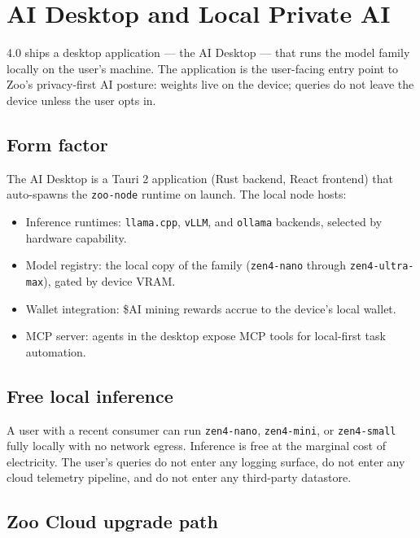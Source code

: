 \section{\Zoo{} AI Desktop and Local Private AI}
\label{sec:ai-desktop}

\Zoo{} 4.0 ships a desktop application --- the \Zoo{} AI Desktop --- that
runs the \Zen{} model family locally on the user's machine. The
application is the user-facing entry point to Zoo's privacy-first AI
posture: weights live on the device; queries do not leave the device
unless the user opts in.

\subsection{Form factor}

The \Zoo{} AI Desktop is a Tauri 2 application (Rust backend, React
frontend) that auto-spawns the \texttt{zoo-node} runtime on launch. The
local node hosts:

\begin{itemize}[leftmargin=1.2em]
  \item Inference runtimes: \texttt{llama.cpp}, \texttt{vLLM}, and
        \texttt{ollama} backends, selected by hardware capability.
  \item Model registry: the local copy of the \Zen{} family
        (\texttt{zen4-nano} through \texttt{zen4-ultra-max}), gated by
        device VRAM.
  \item Wallet integration: \$AI mining rewards accrue to the
        device's local wallet.
  \item MCP server: agents in the desktop expose \Hanzo{} MCP tools for
        local-first task automation.
\end{itemize}

\subsection{Free local inference}

A user with a recent consumer \GPU{} can run \texttt{zen4-nano},
\texttt{zen4-mini}, or \texttt{zen4-small} fully locally with no
network egress. Inference is free at the marginal cost of electricity.
The user's queries do not enter any logging surface, do not enter any
cloud telemetry pipeline, and do not enter any third-party datastore.

\subsection{Zoo Cloud upgrade path}

